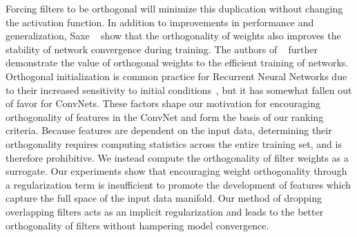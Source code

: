 Forcing filters to be orthogonal will minimize this duplication without changing the activation function.
In addition to improvements in performance and generalization, Saxe \etal ~\cite{Saxe2013ExactST} show that the orthogonality of weights also improves the stability of network convergence during training.
The authors of ~\cite{Xie2017AllYN, Xiao2018DynamicalIA} further demonstrate the value of orthogonal weights to the efficient training of networks.
Orthogonal initialization is common practice for Recurrent Neural Networks due to their increased sensitivity to initial conditions~\cite{Vorontsov2017OnOA}, but it has somewhat fallen out of favor for ConvNets.
These factors shape our motivation for encouraging orthogonality of features in the ConvNet and form the basis of our ranking criteria.
Because features are dependent on the input data, determining their orthogonality requires computing statistics across the entire training set, and is therefore prohibitive.  
We instead compute the orthogonality of filter weights as a surrogate.
Our experiments show that encouraging weight orthogonality through a regularization term is insufficient to promote the development of features which capture the full space of the input data manifold.
Our method of dropping overlapping filters acts as an implicit regularization and leads to the better orthogonality of filters without hampering model convergence.


